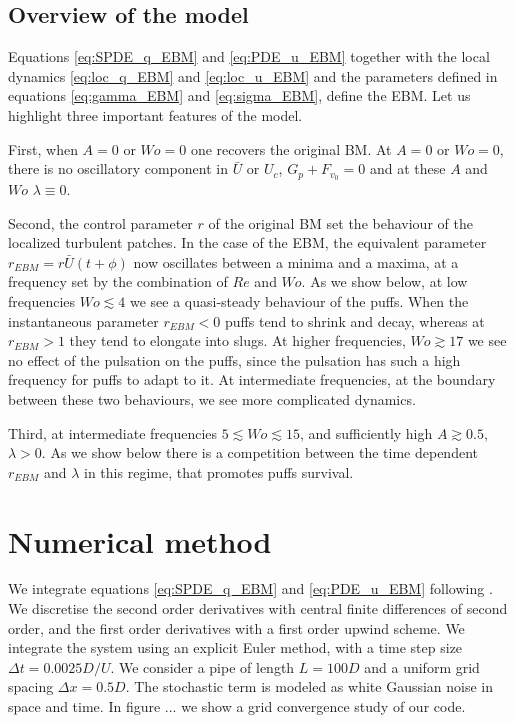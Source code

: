 \documentclass{article}
\begin{document}
\subsection{Overview of the model}
Equations \ref{eq:SPDE_q_EBM} and \ref{eq:PDE_u_EBM} together with the local dynamics \ref{eq:loc_q_EBM} and \ref{eq:loc_u_EBM} and the parameters defined in equations \ref{eq:gamma_EBM} and \ref{eq:sigma_EBM}, define the EBM. Let us highlight three important features of the model.

First, when $A=0$ or $Wo=0$ one recovers the original BM. At $A=0$ or $Wo=0$, there is no oscillatory component in $\bar{U}$ or $U_{c}$, $G_{p}+F_{v_{0}}=0$ and at these $A$ and $Wo$ $\lambda \equiv 0$. 

Second, the control parameter $r$ of the original BM set the behaviour of the localized turbulent patches. In the case of the EBM, the equivalent parameter $r_{EBM}=r \bar{U} \left(t + \phi \right)$ now oscillates between a minima and a maxima, at a frequency set by the combination of $Re$ and $Wo$. As we show below, at low frequencies $Wo \lesssim 4$ we see a quasi-steady behaviour of the puffs. When the instantaneous parameter $r_{EBM} <0$ puffs tend to shrink and decay, whereas at $r_{EBM}>1$ they tend to elongate into slugs. At higher frequencies, $Wo \gtrsim 17$ we see no effect of the pulsation on the puffs, since the pulsation has such a high frequency for puffs to adapt to it. At intermediate frequencies, at the boundary between these two behaviours, we see more complicated dynamics.

Third, at intermediate frequencies $5 \lesssim Wo \lesssim 15$, and sufficiently high $A \gtrsim 0.5$, $\lambda >0$. As we show below there is a competition between the time dependent $r_{EBM}$ and $\lambda$ in this regime, that promotes puffs survival. 

\section{Numerical method}
We integrate equations \ref{eq:SPDE_q_EBM} and \ref{eq:PDE_u_EBM} following \cite{barkley2015rise}. We discretise the second order derivatives with central finite differences of second order, and the first order derivatives with a first order upwind scheme. We integrate the system using an explicit Euler method, with a time step size $\Delta t=0.0025 D/U$. We consider a pipe of length $L=100D$ and a uniform grid spacing $\Delta x=0.5D$. The stochastic term is modeled as white Gaussian noise in space and time. In figure ... we show a grid convergence study of our code. 
\end{document}
